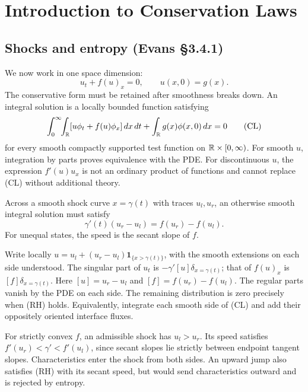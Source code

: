\Needspace{65mm}
\section{Introduction to Conservation Laws}
\label{sec:3-4}

\subsection{Shocks and entropy (Evans \S3.4.1)}
We now work in one space dimension:
\[
 u_t+f(u)_x=0,\qquad u(x,0)=g(x).
\]
The conservative form must be retained after smoothness breaks down.
An integral solution is a locally bounded function satisfying
\[
 \int_0^\infty\!\!\int_{\mathbb{R}}[u\phi_t+f(u)\phi_x]\,dx\,dt
       +\int_{\mathbb{R}}g(x)\phi(x,0)\,dx=0
 \tag{CL}
\]
for every smooth compactly supported test function on $\mathbb{R}\times[0,\infty)$.
For smooth $u$, integration by parts proves equivalence with the PDE.
For discontinuous $u$, the expression $f'(u)u_x$ is not an ordinary
product of functions and cannot replace (CL) without additional theory.
\Needspace{45mm}

\begin{theorem}\label{thm:3-rh}
Across a smooth shock curve $x=\gamma(t)$ with traces $u_l,u_r$,
an otherwise smooth integral solution must satisfy
\[
 \gamma'(t)(u_r-u_l)=f(u_r)-f(u_l).
 \tag{RH}
\]
For unequal states, the speed is the secant slope of $f$.
\end{theorem}
\begin{expandedproof}
Write locally $u=u_l+(u_r-u_l)\mathbf1_{\{x>\gamma(t)\}}$,
with the smooth extensions on each side understood.
The singular part of $u_t$ is $-\gamma'[u]\delta_{x=\gamma(t)}$;
that of $f(u)_x$ is $[f]\delta_{x=\gamma(t)}$.
Here $[u]=u_r-u_l$ and $[f]=f(u_r)-f(u_l)$.
The regular parts vanish by the PDE on each side.
The remaining distribution is zero precisely when (RH) holds.
Equivalently, integrate each smooth side of (CL) and add their
oppositely oriented interface fluxes.
\end{expandedproof}

For strictly convex $f$, an admissible shock has $u_l>u_r$.
Its speed satisfies
$f'(u_r)<\gamma'<f'(u_l)$, since secant slopes lie strictly between
endpoint tangent slopes.
Characteristics enter the shock from both sides.
An upward jump also satisfies (RH) with its secant speed, but would
send characteristics outward and is rejected by entropy.


